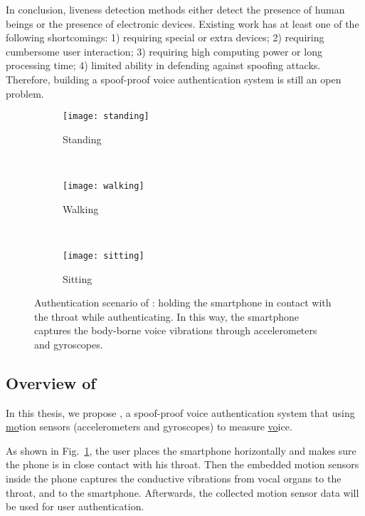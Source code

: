 In conclusion, liveness detection methods either detect the presence of human beings or the presence of electronic devices. Existing work has at least one of the following shortcomings: 1) requiring special or extra devices; 2) requiring cumbersome user interaction; 3) requiring high computing power or long processing time; 4) limited ability in defending against spoofing attacks. Therefore, building a spoof-proof voice authentication system is still an open problem.






\begin{figure}[!h]
	\centering
	\begin{subfigure}[b]{0.15\textwidth}
		\centering
		\texttt{[image: standing]}
		\caption{Standing}
	\end{subfigure}%
	~~~\qquad
	\begin{subfigure}[b]{0.15\textwidth}
		\centering
		\texttt{[image: walking]}
		\caption{Walking}
	\end{subfigure}
	~~~\qquad
	\begin{subfigure}[b]{0.15\textwidth}
		\centering
		\texttt{[image: sitting]}
		\caption{Sitting}
	\end{subfigure}
	\caption[Authentication Scenario of {\shortname}]{Authentication scenario of {\shortname}: holding the smartphone in contact with the throat while authenticating. In this way, the smartphone captures the body-borne voice vibrations through accelerometers and gyroscopes.}
	\label{fig:use}
\end{figure}


\subsection{Overview of {\shortname}}

In this thesis, we propose {\shortname}, a spoof-proof voice authentication system that using \underline{mo}tion sensors (accelerometers and gyroscopes) to measure \underline{vo}ice.


As shown in Fig.~\ref{fig:use}, the user places the smartphone horizontally and makes sure the phone is in close contact with his throat. Then the embedded motion sensors inside the phone captures the conductive vibrations from vocal organs to the throat, and to the smartphone. Afterwards, the collected motion sensor data will be used for user authentication.


